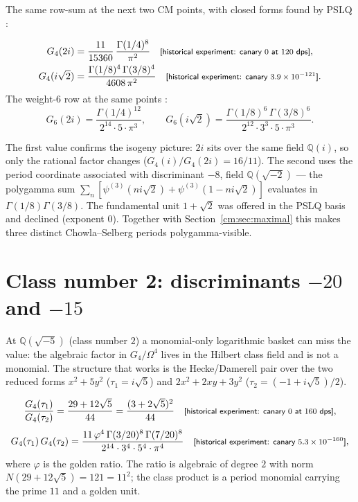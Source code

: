 The same row-sum at the next two CM points, with closed forms found by PSLQ
:

\begin{theorem}\label{cm:res:2i}
\begin{gather*}
G_4(2i)=\frac{11}{15360}\,\frac{\Gamma(1/4)^8}{\pi^2}
\quad\text{\textsf{\footnotesize[historical experiment: canary $0$ at $120$ dps]}},\\
G_4(i\sqrt2)=\frac{\Gamma(1/8)^4\,\Gamma(3/8)^4}{4608\,\pi^2}
\quad\text{\textsf{\footnotesize[historical experiment: canary $3.9\times10^{-121}$]}}.
\end{gather*}
The weight-6 row at the same points :
\[
G_6(2i)=\frac{\Gamma(1/4)^{12}}{2^{14}\cdot 5\cdot\pi^3},\qquad
G_6(i\sqrt2)=\frac{\Gamma(1/8)^6\,\Gamma(3/8)^6}{2^{12}\cdot 3^3\cdot 5\cdot\pi^3}.
\]
\end{theorem}

The first value confirms the isogeny picture: $2i$ sits over the same field $\mathbb{Q}(i)$,
so only the rational factor changes ($G_4(i)/G_4(2i)=16/11$). The second uses the period coordinate associated with discriminant $-8$, field $\mathbb{Q}(\sqrt{-2})$ --- the polygamma sum
$\sum_n[\psi^{(3)}(ni\sqrt2)+\psi^{(3)}(1-ni\sqrt2)]$ evaluates in $\Gamma(1/8)\Gamma(3/8)$.
The fundamental unit $1+\sqrt2$ was offered in the PSLQ basis and declined (exponent $0$).
Together with Section~\ref{cm:sec:maximal} this makes three distinct Chowla--Selberg periods
polygamma-visible.

\section{Class number 2: discriminants \texorpdfstring{$-20$ and $-15$}{-20 and -15}}
\label{cm:sec:h2}

At $\mathbb{Q}(\sqrt{-5})$ (class number $2$) a monomial-only logarithmic basket can miss the value: the algebraic factor in $G_4/\Omega^4$ lives in the Hilbert class field and is not a
monomial. The structure that works is the Hecke/Damerell pair \cite{cm:Damerell} over the two reduced forms
$x^2+5y^2$ ($\tau_1=i\sqrt5$) and $2x^2+2xy+3y^2$ ($\tau_2=(-1+i\sqrt5)/2$).

\begin{theorem}[disc $-20$]\label{cm:res:d20}
\[
\frac{G_4(\tau_1)}{G_4(\tau_2)}=\frac{29+12\sqrt5}{44}=\frac{(3+2\sqrt5)^2}{44}
\quad\text{\textsf{\footnotesize[historical experiment: canary $0$ at $160$ dps]}},
\]
\[
G_4(\tau_1)\,G_4(\tau_2)
=\frac{11\,\varphi^4\,\Gamma(3/20)^8\,\Gamma(7/20)^8}{2^{14}\cdot3^4\cdot5^4\cdot\pi^4}
\quad\text{\textsf{\footnotesize[historical experiment: canary $5.3\times10^{-160}$]}},
\]
where $\varphi$ is the golden ratio. The ratio is algebraic of degree $2$ with norm
$N(29+12\sqrt5)=121=11^2$; the class product is a period monomial carrying the prime $11$
and a golden unit.
\end{theorem}

